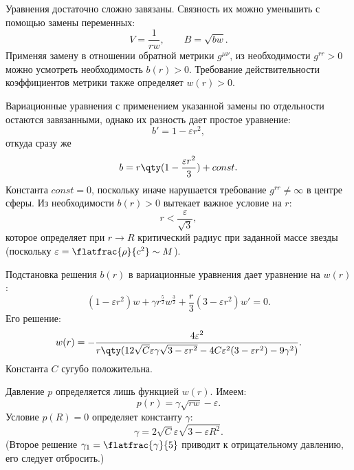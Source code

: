 \documentclass[\docroot/reports/draft/report.tex]{subfiles}
\begin{document}
    Уравнения достаточно сложно завязаны. Связность их можно уменьшить с помощью замены переменных:
    \begin{equation*}
        V = \frac{1}{r w} , \qquad B = \sqrt{b w} .
    \end{equation*}
    Применяя замену в отношении обратной метрики $g^{\mu\nu}$, из необходимости $g^{rr} > 0$ можно усмотреть необходимость $b(r) > 0$. Требование действительности коэффициентов метрики также определяет $w(r) > 0$.

    Вариационные уравнения с применением указанной замены по отдельности остаются завязанными, однако их разность дает простое уравнение:
    \begin{equation*}
        b' = 1 - \varepsilon r^2 ,
    \end{equation*}
    откуда сразу же
    \begin{equation*}
        b = r \qty(1 - \frac{\varepsilon r^2}{3}) + const .
    \end{equation*}
    Константа $const = 0$, поскольку иначе нарушается требование $g^{rr} \neq \infty$ в центре сферы. Из необходимости $b(r) > 0$ вытекает важное условие на $r$:
    \begin{equation*}
        r < \frac{\varepsilon}{\sqrt{3}} ,
    \end{equation*}
    которое определяет при $r \to R$ критический радиус при заданной массе звезды (поскольку $\varepsilon = \flatfrac{\rho}{c^2} \sim M$).

    Подстановка решения $b(r)$ в вариационные уравнения дает уравнение на $w(r)$:
    \begin{equation*}
        (1 - \varepsilon r^2) w + \gamma r^\frac{5}{2} w^\frac{3}{2} + \frac{r}{3} (3 - \varepsilon r^2) w' = 0 .
    \end{equation*}
    Его решение:
    \begin{equation*}
        w(r) = - \frac{4 \varepsilon^2}{
            r \qty(
                12 \sqrt{C} \varepsilon \gamma \sqrt{3 - \varepsilon r^2} - 4 C \varepsilon^2 (3 - \varepsilon r^2) - 9 \gamma^2
            )
        } .
    \end{equation*}
    Константа $C$ сугубо положительна.

    Давление $p$ определяется лишь функцией $w(r)$. Имеем:
    \begin{equation*}
        p(r) = \gamma \sqrt{r w} - \varepsilon .
    \end{equation*}
    Условие $p(R) = 0$ определяет константу $\gamma$:
    \begin{equation*}
        \gamma = 2 \sqrt{C} \varepsilon \sqrt{3 - \varepsilon R^2} .
    \end{equation*}
    (Второе решение $\gamma_1 = \flatfrac{\gamma}{5}$ приводит к отрицательному давлению, его следует отбросить.)
\end{document}

